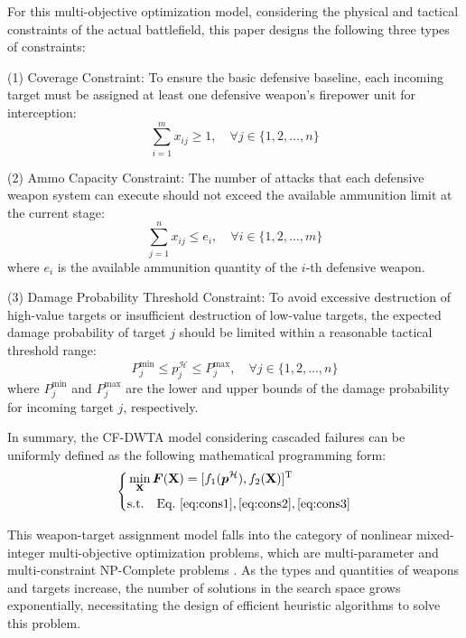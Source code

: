 \documentclass[lettersize,journal]{IEEEtran}
\begin{document}
For this multi-objective optimization model, considering the physical and tactical constraints of the actual battlefield, this paper designs the following three types of constraints:

(1) Coverage Constraint: To ensure the basic defensive baseline, each incoming target must be assigned at least one defensive weapon's firepower unit for interception:
\begin{equation}
\label{eq:cons1}
    \sum_{i=1}^{m} x_{ij} \geq 1, \quad \forall j \in \{1, 2, \dots, n\}
\end{equation}

(2) Ammo Capacity Constraint: The number of attacks that each defensive weapon system can execute should not exceed the available ammunition limit at the current stage:
\begin{equation}
\label{eq:cons2}
    \sum_{j=1}^{n} x_{ij} \leq e_i, \quad \forall i \in \{1, 2, \dots, m\}
\end{equation}
where $e_i$ is the available ammunition quantity of the $i$-th defensive weapon.

(3) Damage Probability Threshold Constraint: To avoid excessive destruction of high-value targets or insufficient destruction of low-value targets, the expected damage probability of target $j$ should be limited within a reasonable tactical threshold range:
\begin{equation}
\label{eq:cons3}
    P_{j}^{\min} \leq p_j^{\mathcal{H}} \leq P_{j}^{\max}, \quad \forall j \in \{1, 2, \dots, n\}
\end{equation}
where $P_{j}^{\min}$ and $P_{j}^{\max}$ are the lower and upper bounds of the damage probability for incoming target $j$, respectively.

In summary, the CF-DWTA model considering cascaded failures can be uniformly defined as the following mathematical programming form:
\begin{equation}
\left\{
\begin{aligned}
    & \min_{\mathbf{X}} \boldsymbol{F}(\mathbf{X}) = [f_1(\boldsymbol{p}^{\mathcal{H}}), f_2(\mathbf{X})]^{\text{T}} \\
    & \text{s.t.} \quad \text{Eq.} \ \eqref{eq:cons1}, \eqref{eq:cons2}, \eqref{eq:cons3} \\
\end{aligned}
\right.
\label{eq:final_optimization_model}
\end{equation}

This weapon-target assignment model falls into the category of nonlinear mixed-integer multi-objective optimization problems, which are multi-parameter and multi-constraint NP-Complete problems \cite{day1966allocating}. As the types and quantities of weapons and targets increase, the number of solutions in the search space grows exponentially, necessitating the design of efficient heuristic algorithms to solve this problem.
\end{document}
